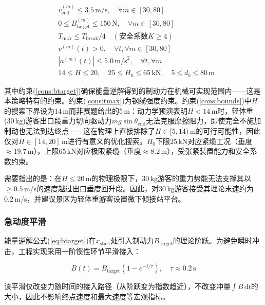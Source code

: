 \documentclass[12pt,a4paper]{ctexart}
\begin{document}
\begin{align}
  & v^{(m)}_{\text{end}} \leq 3.5\,\text{m/s}, \quad \forall m \in [30, 80] \label{cons:safety} \\
  & 0 \leq B_{\text{target}}^{(m)} \leq 150\,\text{N}, \quad \forall m \in [30, 80] \label{cons:btarget} \\
  & T_{\max} \leq T_{\text{break}} / 4 \quad (\text{安全系数} K \geq 4) \label{cons:tmax} \\
  & v^{(m)}(t) > 0,\quad \forall t, \forall m \in [30, 80] \label{cons:nonstop} \\
  & |a^{(m)}(t)| \leq 5.0\,\text{m/s}^2,\quad \forall t, \forall m \label{cons:accel} \\
  & 14 \leq H \leq 20,\quad 25 \leq H_0 \leq 65\,\text{kN},\quad 5 \leq d_b \leq 80\,\text{m} \label{cons:bounds}
\end{align}

其中约束(\ref{cons:btarget})确保能量逆解得到的制动力在机械可实现范围内——这是本策略特有的约束。约束(\ref{cons:tmax})为钢缆强度约束。约束(\ref{cons:bounds})中$H$的搜索下界设为14\,m而非赛题给出的5\,m：动力学预演表明$H<14$\,m时，轻体重(30\,kg)游客出口段重力切向驱动力$mg\sin\theta_{\text{end}}$无法克服摩擦阻力，即使完全不施加制动也无法到达终点——这在物理上直接排除了$H\in[5,14)$\,m的可行可能性，因此仅对$H\in[14,20]$\,m进行有意义的优化搜索。$H_0$下限25\,kN对应紧缆工况（垂度$\approx 19.7$\,m），上限65\,kN对应极限紧缆（垂度$\approx 8.2$\,m），受张紧装置能力和安全系数约束。

需要指出的是：在$H\leq 20$\,m的物理极限下，30\,kg游客的重力势能无法支撑其以$\geq 0.5$\,m/s的速度越过出口垂度回升段。因此，对30\,kg游客接受其理论末速约为0.2\,m/s，并建议景区为轻体重游客设置微下倾接站平台。

\subsubsection{急动度平滑}

能量逆解公式(\ref{eq:btarget})在$x_{\text{start}}$处引入制动力$B_{\text{target}}$的理论阶跃。为避免瞬时冲击，工程实现采用一阶惯性环节平滑接入：

\begin{equation}
  B(t) = B_{\text{target}} \left(1 - e^{-t/\tau}\right), \quad \tau \approx 0.2\,\text{s}
  \label{eq:jerk_smooth}
\end{equation}

该平滑仅改变力随时间的接入路径（从阶跃变为指数趋近），不改变冲量$\int B\,\mathrm{d}t$的大小，因此不影响终点速度和最大速度等宏观指标。
\end{document}
